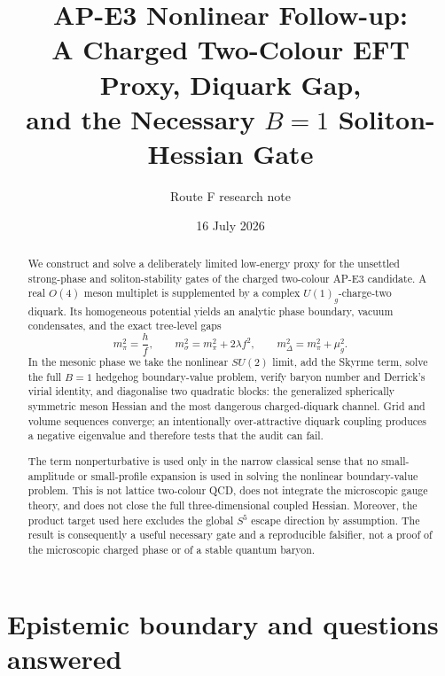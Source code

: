 \documentclass[11pt]{article}
\title{AP-E3 Nonlinear Follow-up:\\
A Charged Two-Colour EFT Proxy, Diquark Gap,\\
and the Necessary \(B=1\) Soliton-Hessian Gate}
\author{Route F research note}
\date{16 July 2026}
\theoremstyle{definition}
\theoremstyle{remark}
\begin{document}
\maketitle

\begin{abstract}
We construct and solve a deliberately limited low-energy proxy for the
unsettled strong-phase and soliton-stability gates of the charged two-colour
AP-E3 candidate.  A real \(O(4)\) meson multiplet is supplemented by a
complex \(U(1)_g\)-charge-two diquark.  Its homogeneous potential yields an
analytic phase boundary, vacuum condensates, and the exact tree-level gaps
\[
 m_\pi^2=\frac{h}{f},\qquad
 m_\sigma^2=m_\pi^2+2\lambda f^2,\qquad
 m_\Delta^2=m_\pi^2+\mu_g^2.
\]
In the mesonic phase we take the nonlinear \(SU(2)\) limit, add the Skyrme
term, solve the full \(B=1\) hedgehog boundary-value problem, verify baryon
number and Derrick's virial identity, and diagonalise two quadratic blocks:
the generalized spherically symmetric meson Hessian and the most dangerous
charged-diquark channel.  Grid and volume sequences converge; an intentionally
over-attractive diquark coupling produces a negative eigenvalue and therefore
tests that the audit can fail.

The term nonperturbative is used only in the narrow classical sense that no
small-amplitude or small-profile expansion is used in solving the nonlinear
boundary-value problem.  This is not lattice two-colour QCD, does not
integrate the microscopic gauge theory, and does not close the full
three-dimensional coupled Hessian.  Moreover, the product target used here
excludes the global \(S^5\) escape direction by assumption.  The result is
consequently a useful necessary gate and a reproducible falsifier, not a proof
of the microscopic charged phase or of a stable quantum baryon.
\end{abstract}

\tableofcontents

\section{Epistemic boundary and questions answered}
\end{document}

